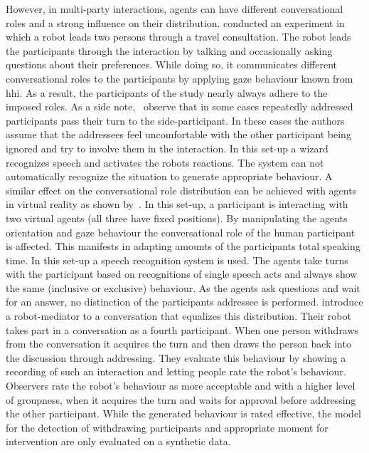 However, in multi-party interactions, agents can have different \glspl{conversational role} and a strong influence on their distribution.
 conducted an experiment in which a \gls{robot} leads two persons through a travel consultation.
The \gls{robot} leads the participants through the interaction by talking and occasionally asking questions about their preferences.
While doing so, it communicates different \glspl{conversational role} to the participants by applying gaze behaviour known from \gls{hhi}.
As a result, the participants of the study nearly always adhere to the imposed roles.
As a side note,~ observe that in some cases repeatedly addressed participants pass their \gls{turn} to the \gls{side-participant}.
In these cases the authors assume that the \glspl{addressee} feel uncomfortable with the other participant being ignored and try to involve them in the interaction.
In this set-up a \gls{wizard} recognizes speech and activates the \gls{robot}s reactions.
The system can not automatically recognize the situation to generate appropriate  behaviour.
A similar effect on the \gls{conversational role} distribution can be achieved with agents in virtual reality as shown by~.
In this set-up, a participant is interacting with two \glspl{virtual agent} (all three have fixed positions).
By manipulating the agents orientation and gaze behaviour the \gls{conversational role} of the human participant is affected.
This manifests in adapting amounts of the participants total speaking time.
In this set-up a speech recognition system is used.
The agents take \glspl{turn} with the participant based on recognitions of single speech acts and always show the same (inclusive or exclusive) behaviour.
As the agents ask questions and wait for an answer, no distinction of the participants \gls{addressee} is performed.
 introduce a \gls{robot}-mediator to a \gls{conversation} that equalizes this distribution. 
Their \gls{robot} takes part in a \gls{conversation} as a fourth participant.
When one person withdraws from the \gls{conversation} it acquires the \gls{turn} and then draws the person back into the discussion through addressing.
They evaluate this behaviour by showing a recording of such an interaction and letting people rate the \gls{robot}'s behaviour.
Observers rate the \gls{robot}'s behaviour as more acceptable and with a higher level of groupness, when it acquires the \gls{turn} and waits for approval before addressing the other participant.
While the generated behaviour is rated effective, the model for the detection of withdrawing participants and appropriate moment for intervention are only evaluated on a synthetic data.

